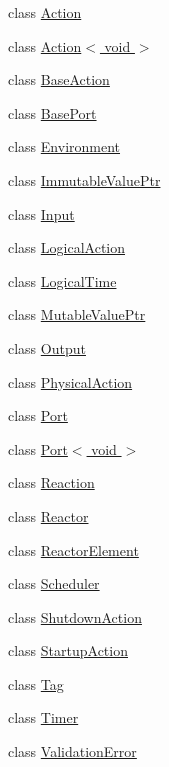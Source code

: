 \begin{DoxyCompactItemize}
\item 
class \hyperlink{classreactor_1_1Action}{Action}
\item 
class \hyperlink{classreactor_1_1Action_3_01void_01_4}{Action$<$ void $>$}
\item 
class \hyperlink{classreactor_1_1BaseAction}{Base\+Action}
\item 
class \hyperlink{classreactor_1_1BasePort}{Base\+Port}
\item 
class \hyperlink{classreactor_1_1Environment}{Environment}
\item 
class \hyperlink{classreactor_1_1ImmutableValuePtr}{Immutable\+Value\+Ptr}
\item 
class \hyperlink{classreactor_1_1Input}{Input}
\item 
class \hyperlink{classreactor_1_1LogicalAction}{Logical\+Action}
\item 
class \hyperlink{classreactor_1_1LogicalTime}{Logical\+Time}
\item 
class \hyperlink{classreactor_1_1MutableValuePtr}{Mutable\+Value\+Ptr}
\item 
class \hyperlink{classreactor_1_1Output}{Output}
\item 
class \hyperlink{classreactor_1_1PhysicalAction}{Physical\+Action}
\item 
class \hyperlink{classreactor_1_1Port}{Port}
\item 
class \hyperlink{classreactor_1_1Port_3_01void_01_4}{Port$<$ void $>$}
\item 
class \hyperlink{classreactor_1_1Reaction}{Reaction}
\item 
class \hyperlink{classreactor_1_1Reactor}{Reactor}
\item 
class \hyperlink{classreactor_1_1ReactorElement}{Reactor\+Element}
\item 
class \hyperlink{classreactor_1_1Scheduler}{Scheduler}
\item 
class \hyperlink{classreactor_1_1ShutdownAction}{Shutdown\+Action}
\item 
class \hyperlink{classreactor_1_1StartupAction}{Startup\+Action}
\item 
class \hyperlink{classreactor_1_1Tag}{Tag}
\item 
class \hyperlink{classreactor_1_1Timer}{Timer}
\item 
class \hyperlink{classreactor_1_1ValidationError}{Validation\+Error}
\end{DoxyCompactItemize}
